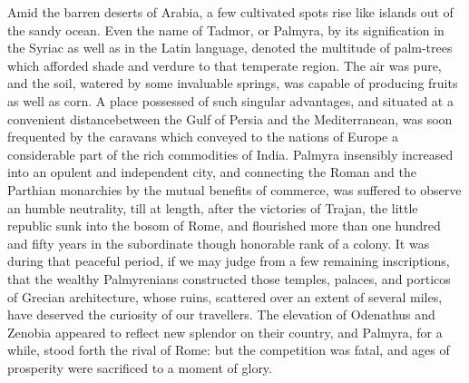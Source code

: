Amid the barren deserts of Arabia, a few cultivated spots rise
like islands out of the sandy ocean. Even the name of Tadmor, or
Palmyra, by its signification in the Syriac as well as in the
Latin language, denoted the multitude of palm-trees which
afforded shade and verdure to that temperate region. The air was
pure, and the soil, watered by some invaluable springs, was
capable of producing fruits as well as corn. A place possessed of
such singular advantages, and situated at a convenient distance\footnotemark[68]
between the Gulf of Persia and the Mediterranean, was soon
frequented by the caravans which conveyed to the nations of
Europe a considerable part of the rich commodities of India.
Palmyra insensibly increased into an opulent and independent
city, and connecting the Roman and the Parthian monarchies by the
mutual benefits of commerce, was suffered to observe an humble
neutrality, till at length, after the victories of Trajan, the
little republic sunk into the bosom of Rome, and flourished more
than one hundred and fifty years in the subordinate though
honorable rank of a colony. It was during that peaceful period,
if we may judge from a few remaining inscriptions, that the
wealthy Palmyrenians constructed those temples, palaces, and
porticos of Grecian architecture, whose ruins, scattered over an
extent of several miles, have deserved the curiosity of our
travellers. The elevation of Odenathus and Zenobia appeared to
reflect new splendor on their country, and Palmyra, for a while,
stood forth the rival of Rome: but the competition was fatal, and
ages of prosperity were sacrificed to a moment of glory.\footnotemark[69]



